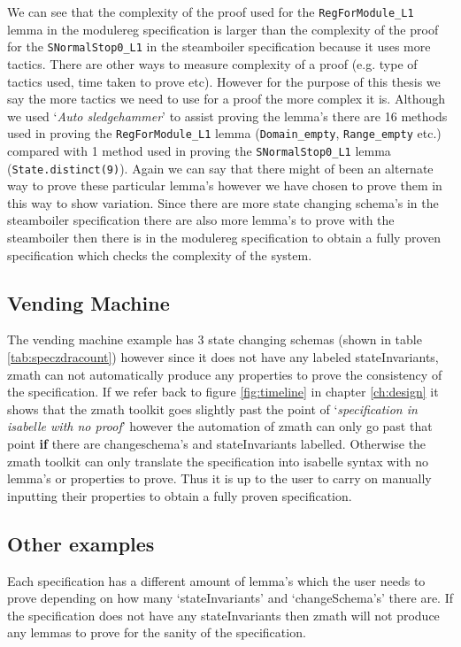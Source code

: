 We can see that the complexity of the proof used for the \verb|RegForModule_L1|
lemma in the modulereg specification is larger than the complexity of the proof
for the \verb|SNormalStop0_L1| in the steamboiler specification because it uses
more tactics.
There are other ways to measure
complexity of a proof (e.g. type of tactics used, time taken to prove etc). 
However for the purpose of this
thesis we say the more tactics we need to use for a proof the more complex it
is.  Although we
used `\emph{Auto sledgehammer}' to assist proving the lemma's there are 16
methods used in proving the \verb|RegForModule_L1| lemma (\verb|Domain_empty|,
\verb|Range_empty| etc.) compared with 1 method used in proving the
\verb|SNormalStop0_L1| lemma (\verb|State.distinct(9)|). Again we can say that
there might of been an alternate way to prove these particular lemma's however
we have chosen to prove them in this way to show variation. Since there are more
state changing schema's in the steamboiler specification there are also more
lemma's to prove with the steamboiler then there is in the modulereg
specification to obtain a fully proven specification which checks the complexity
of the system.

\subsection{Vending Machine}

The vending machine example has 3 state changing schemas (shown in table
\ref{tab:speczdracount}) however since it does not have any labeled
stateInvariants, \gls{zmath} can not automatically produce any properties to
prove the consistency of the specification. If we refer back to figure
\ref{fig:timeline} in chapter \ref{ch:design} it shows that the \gls{zmath}
toolkit goes slightly past the point of `\emph{specification in isabelle with no
proof}' however the automation of \gls{zmath} can only go past that point
\textbf{if} there are changeschema's and stateInvariants labelled. Otherwise the
\gls{zmath} toolkit can only translate the specification into isabelle syntax
with no lemma's or properties to prove. Thus it is up to the user to carry on
manually inputting their properties to obtain a fully proven specification.

\subsection{Other examples}

Each specification has a different amount of lemma's which the user needs to
prove depending on how many `stateInvariants' and `changeSchema's' there are. If
the specification does not have any stateInvariants then \gls{zmath} will not
produce any lemmas to prove for the sanity of the specification.

